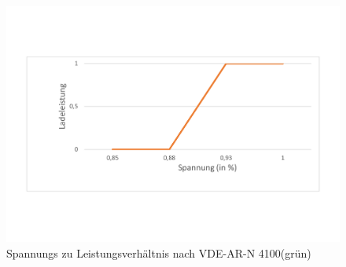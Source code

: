 \begin{figure}[htb]
	\includegraphics[width=\linewidth]{img/Dia2.pdf}
	\caption{Spannungs zu Leistungsverhältnis nach VDE-AR-N 4100(grün)}
	\label{Abb_VDEController}
\end{figure}

